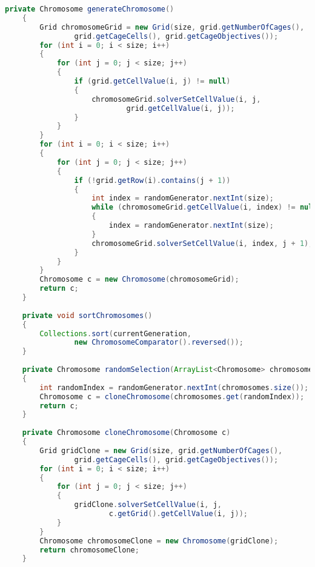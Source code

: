 \begin{lstlisting}[language=Java,basicstyle=\tiny,caption=SolverGenetic.java]
    private Chromosome generateChromosome()
    {
        Grid chromosomeGrid = new Grid(size, grid.getNumberOfCages(), 
                grid.getCageCells(), grid.getCageObjectives());
        for (int i = 0; i < size; i++)
        {
            for (int j = 0; j < size; j++)
            {
                if (grid.getCellValue(i, j) != null)
                {
                    chromosomeGrid.solverSetCellValue(i, j, 
                            grid.getCellValue(i, j));
                }
            }
        }
        for (int i = 0; i < size; i++)
        {
            for (int j = 0; j < size; j++)
            {
                if (!grid.getRow(i).contains(j + 1))
                {
                    int index = randomGenerator.nextInt(size);
                    while (chromosomeGrid.getCellValue(i, index) != null)
                    {
                        index = randomGenerator.nextInt(size);
                    }
                    chromosomeGrid.solverSetCellValue(i, index, j + 1);
                }
            }
        }
        Chromosome c = new Chromosome(chromosomeGrid);
        return c;
    }
    
    private void sortChromosomes()
    {
        Collections.sort(currentGeneration, 
                new ChromosomeComparator().reversed());
    }
    
    private Chromosome randomSelection(ArrayList<Chromosome> chromosomes)
    {
        int randomIndex = randomGenerator.nextInt(chromosomes.size());
        Chromosome c = cloneChromosome(chromosomes.get(randomIndex));
        return c;
    }
    
    private Chromosome cloneChromosome(Chromosome c)
    {
        Grid gridClone = new Grid(size, grid.getNumberOfCages(), 
                grid.getCageCells(), grid.getCageObjectives());
        for (int i = 0; i < size; i++)
        {
            for (int j = 0; j < size; j++)
            {
                gridClone.solverSetCellValue(i, j, 
                        c.getGrid().getCellValue(i, j));
            }
        }
        Chromosome chromosomeClone = new Chromosome(gridClone);
        return chromosomeClone;
    }
    

\end{lstlisting}

